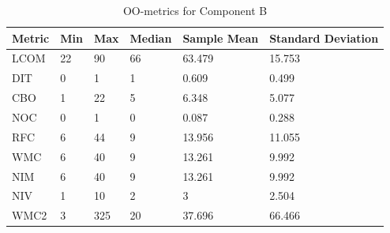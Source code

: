 

\begin{table}[]
\centering
\caption{OO-metrics for Component B}
\label{tab:oometrics-blc}
\begin{tabular}{|l|l|l|l|l|l|}
\hline
\textbf{Metric} & \textbf{Min} & \textbf{Max} & \textbf{Median} & \textbf{Sample Mean} & \textbf{Standard Deviation} \\ \hline
LCOM            & 22           & 90          & 66              & 63.479               & 15.753                    \\ \hline
DIT             & 0           & 1           & 1             & 0.609              & 0.499                       \\ \hline
CBO             & 1          & 22           & 5              & 6.348                & 5.077                       \\ \hline
NOC             & 0            & 1           & 0               & 0.087                & 0.288                       \\ \hline
RFC             & 6            & 44          & 9              & 13.956               & 11.055                      \\ \hline
WMC             & 6            & 40           & 9              & 13.261                & 9.992                       \\ \hline
NIM             & 6           & 40           & 9               & 13.261                & 9.992                       \\ \hline
NIV             & 1            & 10           & 2               & 3                & 2.504                       \\ \hline
WMC2            & 3            & 325          & 20              & 37.696               & 66.466                      \\ \hline
\end{tabular}
\end{table}


